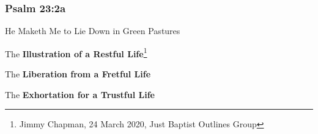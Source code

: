 \subsubsection{Psalm 23:2a}
He Maketh Me to Lie Down in Green Pastures\\
\begin{compactenum}[I.]
    \item The \textbf{Illustration of a Restful Life}\footnote{Jimmy Chapman, 24 March 2020, Just Baptist Outlines Group}
    \item The \textbf{Liberation from a Fretful Life}
    \item The \textbf{Exhortation for a Trustful Life}
\end{compactenum}